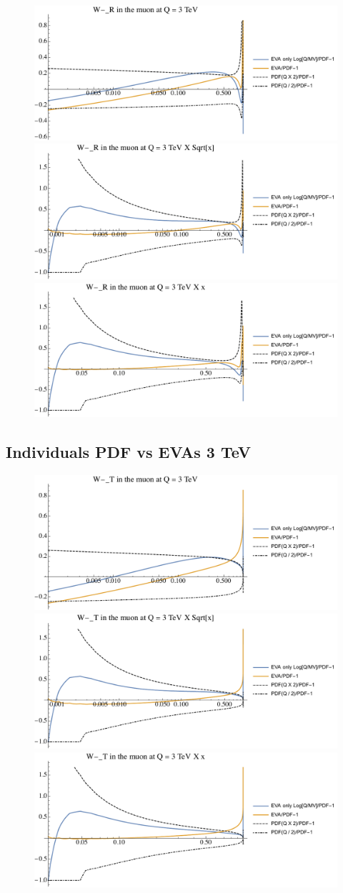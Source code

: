 \documentclass[a4paper,11pt]{article}
\begin{document}
\begin{figure}[ht]
\includegraphics[width=0.46\linewidth]{Notebooks/PlotPDFs/ratios/3TeV/W-_R_Q.pdf}
\includegraphics[width=0.46\linewidth]{Notebooks/PlotPDFs/ratios/3TeV/W-_R_Qsqrtx.pdf}
\includegraphics[width=0.46\linewidth]{Notebooks/PlotPDFs/ratios/3TeV/W-_R_Qx.pdf}
\end{figure}

\clearpage
\subsection{Individuals PDF vs EVAs 3 TeV}

\begin{figure}[ht]
\includegraphics[width=0.46\linewidth]{Notebooks/PlotPDFs/ratios/3TeV/W-_T_Q.pdf}
\includegraphics[width=0.46\linewidth]{Notebooks/PlotPDFs/ratios/3TeV/W-_T_Qsqrtx.pdf}
\includegraphics[width=0.46\linewidth]{Notebooks/PlotPDFs/ratios/3TeV/W-_T_Qx.pdf}
\end{figure}
\end{document}
